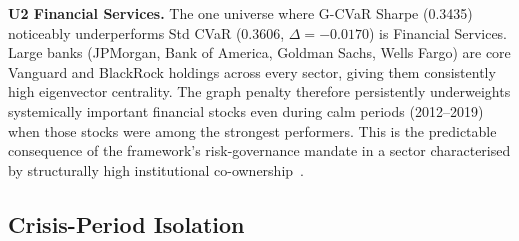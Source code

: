 \textbf{U2 Financial Services.}
The one universe where G-CVaR Sharpe (0.3435) noticeably underperforms
Std CVaR (0.3606, $\Delta = -0.0170$) is Financial Services. Large banks
(JPMorgan, Bank of America, Goldman Sachs, Wells Fargo) are core Vanguard
and BlackRock holdings across every sector, giving them consistently high
eigenvector centrality. The graph penalty therefore persistently
underweights systemically important financial stocks even during calm
periods (2012--2019) when those stocks were among the strongest performers.
This is the predictable consequence of the framework's risk-governance
mandate in a sector characterised by structurally high institutional
co-ownership~\citep{azar2018,billio2012}.

\subsection{Crisis-Period Isolation}

\begin{table}[htbp]
\centering
\caption{Crisis period isolation (Table~10, U1): MDD and CVaR@95\%
         for G-CVaR, Std CVaR, and Equal Weight during three predefined
         crisis periods~\citep{billio2012}.}
\label{tab:crisis}
\end{table}

